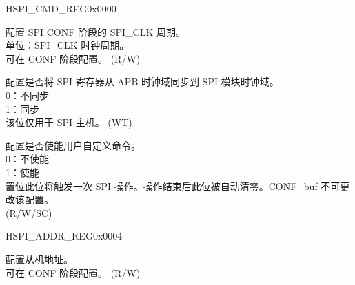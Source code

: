 \begin{register}{H}{SPI\_CMD\_REG}{0x0000}\label{regdesc:SPICMDREG}
%
%
%
%
%
\regnewline%
\begin{regdesc}\begin{reglist}
\label{fielddesc:SPICONFBITLEN}\item [SPI\_CONF\_BITLEN] 配置 SPI CONF 阶段的 SPI\_CLK 周期。 \\
单位：SPI\_CLK 时钟周期。\\
可在 CONF 阶段配置。 (R/W)
\label{fielddesc:SPIUPDATE}\item [SPI\_UPDATE] 配置是否将 SPI 寄存器从 APB 时钟域同步到 SPI 模块时钟域。\\
0：不同步 \\
1：同步 \\
该位仅用于 SPI 主机。 (WT)
\label{fielddesc:SPIUSR}\item [SPI\_USR] 配置是否使能用户自定义命令。\\
0：不使能 \\
1：使能 \\
置位此位将触发一次 SPI 操作。操作结束后此位被自动清零。CONF\_buf 不可更改该配置。 \\
(R/W/SC)
\end{reglist}\end{regdesc}
\end{register}


\begin{register}{H}{SPI\_ADDR\_REG}{0x0004}\label{regdesc:SPIADDRREG}
%
\regnewline%
\begin{regdesc}\begin{reglist}
\label{fielddesc:SPIUSRADDRVALUE}\item [SPI\_USR\_ADDR\_VALUE] 配置从机地址。\\
可在 CONF 阶段配置。 (R/W)
\end{reglist}\end{regdesc}
\end{register}


